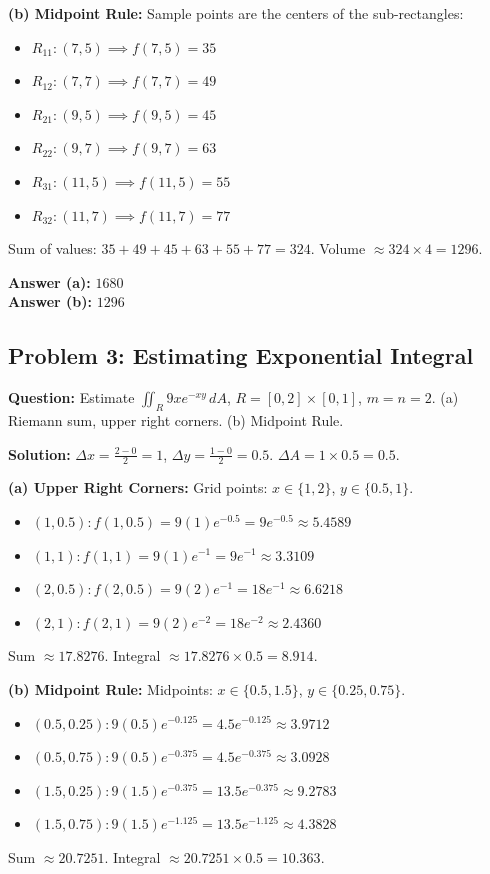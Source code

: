 \documentclass[11pt,a4paper]{article}
\begin{document}
\textbf{(b) Midpoint Rule:}
Sample points are the centers of the sub-rectangles:
\begin{itemize}
    \item $R_{11}: (7,5) \implies f(7,5) = 35$
    \item $R_{12}: (7,7) \implies f(7,7) = 49$
    \item $R_{21}: (9,5) \implies f(9,5) = 45$
    \item $R_{22}: (9,7) \implies f(9,7) = 63$
    \item $R_{31}: (11,5) \implies f(11,5) = 55$
    \item $R_{32}: (11,7) \implies f(11,7) = 77$
\end{itemize}
Sum of values: $35 + 49 + 45 + 63 + 55 + 77 = 324$.
Volume $\approx 324 \times 4 = 1296$.

\textbf{Answer (a):} $1680$ \\
\textbf{Answer (b):} $1296$

\subsection*{Problem 3: Estimating Exponential Integral}
\textbf{Question:} Estimate $\iint_R 9xe^{-xy} \, dA$, $R = [0,2] \times [0,1]$, $m=n=2$.
(a) Riemann sum, upper right corners.
(b) Midpoint Rule.

\textbf{Solution:}
$\Delta x = \frac{2-0}{2} = 1$, $\Delta y = \frac{1-0}{2} = 0.5$.
$\Delta A = 1 \times 0.5 = 0.5$.

\textbf{(a) Upper Right Corners:}
Grid points: $x \in \{1, 2\}$, $y \in \{0.5, 1\}$.
\begin{itemize}
    \item $(1, 0.5): f(1, 0.5) = 9(1)e^{-0.5} = 9e^{-0.5} \approx 5.4589$
    \item $(1, 1): f(1, 1) = 9(1)e^{-1} = 9e^{-1} \approx 3.3109$
    \item $(2, 0.5): f(2, 0.5) = 9(2)e^{-1} = 18e^{-1} \approx 6.6218$
    \item $(2, 1): f(2, 1) = 9(2)e^{-2} = 18e^{-2} \approx 2.4360$
\end{itemize}
Sum $\approx 17.8276$.
Integral $\approx 17.8276 \times 0.5 = 8.914$.

\textbf{(b) Midpoint Rule:}
Midpoints: $x \in \{0.5, 1.5\}$, $y \in \{0.25, 0.75\}$.
\begin{itemize}
    \item $(0.5, 0.25): 9(0.5)e^{-0.125} = 4.5 e^{-0.125} \approx 3.9712$
    \item $(0.5, 0.75): 9(0.5)e^{-0.375} = 4.5 e^{-0.375} \approx 3.0928$
    \item $(1.5, 0.25): 9(1.5)e^{-0.375} = 13.5 e^{-0.375} \approx 9.2783$
    \item $(1.5, 0.75): 9(1.5)e^{-1.125} = 13.5 e^{-1.125} \approx 4.3828$
\end{itemize}
Sum $\approx 20.7251$.
Integral $\approx 20.7251 \times 0.5 = 10.363$.
\end{document}
